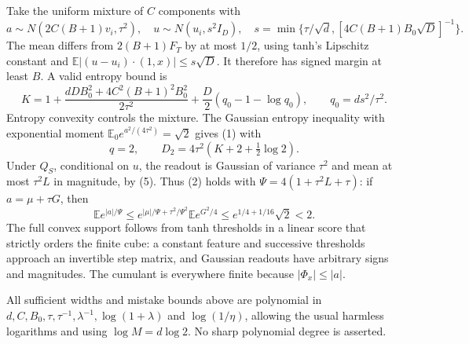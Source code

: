 \documentclass[11pt]{article}
\newcommand{\E}{\mathbb E}
\begin{document}
Take the uniform mixture of $C$ components with
\[
 a\sim N(2C(B+1)v_i,\tau^2),\quad
 u\sim N(u_i,s^2I_D),\quad
 s=\min\{\tau/\sqrt d,[4C(B+1)B_0\sqrt D]^{-1}\}.
\]
The mean differs from $2(B+1)F_T$ by at most $1/2$, using tanh's
Lipschitz constant and $\E|(u-u_i)\cdot(1,x)|\le s\sqrt D$.
It therefore has signed margin at least $B$. A valid entropy bound is
\[
 K=1+\frac{dDB_0^2+4C^2(B+1)^2B_0^2}{2\tau^2}
       +\frac D2(q_0-1-\log q_0),\qquad q_0=ds^2/\tau^2.
\]
Entropy convexity controls the mixture. The Gaussian entropy inequality
with exponential moment $\E_0e^{a^2/(4\tau^2)}=\sqrt2$ gives (1) with
\[
                     q=2,\qquad
 D_2=4\tau^2(K+2+\tfrac12\log2).
\]
Under $Q_S$, conditional on $u$, the readout is Gaussian of variance
$\tau^2$ and mean at most $\tau^2 L$ in magnitude, by (5). Thus (2)
holds with $\Psi=4(1+\tau^2 L+\tau)$: if $a=\mu+\tau G$, then
\[
 \E e^{|a|/\Psi}
 \le e^{|\mu|/\Psi+\tau^2/\Psi^2}\E e^{G^2/4}
 \le e^{1/4+1/16}\sqrt2<2.
\]
The full convex support follows from tanh thresholds in a linear score
that strictly orders the finite cube: a constant feature and successive
thresholds approach an invertible step matrix, and Gaussian readouts
have arbitrary signs and magnitudes. The cumulant is everywhere finite
because $|\Phi_x|\le|a|$.

All sufficient widths and mistake bounds above are polynomial in
$d,C,B_0,\tau,\tau^{-1},\lambda^{-1},\log(1+\lambda)$ and
$\log(1/\eta)$, allowing the usual harmless logarithms and using
$\log M=d\log2$. No sharp polynomial degree is asserted.
\end{document}
